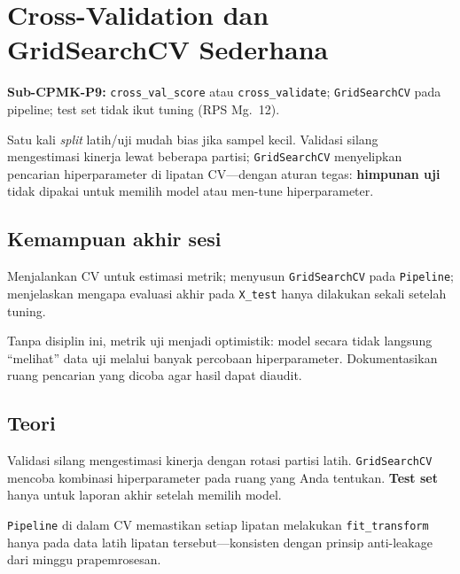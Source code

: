 \documentclass[../main.tex]{subfiles}
\begin{document}
\chapter{Cross-Validation dan GridSearchCV Sederhana}

\begin{subcpmk}
  \item \textbf{Sub-CPMK-P9:} \texttt{cross\_val\_score} atau \texttt{cross\_validate}; \texttt{GridSearchCV} pada pipeline; test set tidak ikut tuning (RPS Mg.\ 12).
\end{subcpmk}


\noindent Satu kali \textit{split} latih/uji mudah bias jika sampel kecil. Validasi silang mengestimasi kinerja lewat beberapa partisi; \texttt{GridSearchCV} menyelipkan pencarian hiperparameter di lipatan CV---dengan aturan tegas: \textbf{himpunan uji} tidak dipakai untuk memilih model atau men-tune hiperparameter.

\section{Kemampuan akhir sesi}

Menjalankan CV untuk estimasi metrik; menyusun \texttt{GridSearchCV} pada \texttt{Pipeline}; menjelaskan mengapa evaluasi akhir pada \texttt{X\_test} hanya dilakukan sekali setelah tuning.

Tanpa disiplin ini, metrik uji menjadi optimistik: model secara tidak langsung ``melihat'' data uji melalui banyak percobaan hiperparameter. Dokumentasikan ruang pencarian yang dicoba agar hasil dapat diaudit.

\section{Teori}

\begin{konsep}
Validasi silang mengestimasi kinerja dengan rotasi partisi latih. \texttt{GridSearchCV} mencoba kombinasi hiperparameter pada ruang yang Anda tentukan. \textbf{Test set} hanya untuk laporan akhir setelah memilih model.
\end{konsep}

\texttt{Pipeline} di dalam CV memastikan setiap lipatan melakukan \texttt{fit\_transform} hanya pada data latih lipatan tersebut---konsisten dengan prinsip anti-leakage dari minggu prapemrosesan.


\end{document}
